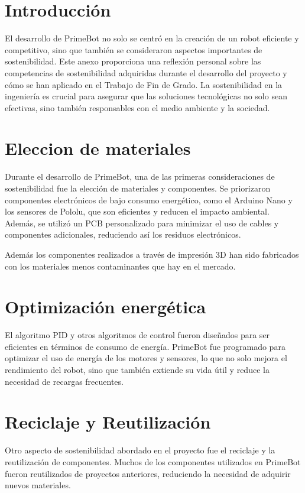 
\section{Introducción}

El desarrollo de PrimeBot no solo se centró en la creación de un robot eficiente y competitivo, sino que también se consideraron aspectos importantes de sostenibilidad. Este anexo proporciona una reflexión personal sobre las competencias de sostenibilidad adquiridas durante el desarrollo del proyecto y cómo se han aplicado en el Trabajo de Fin de Grado. La sostenibilidad en la ingeniería es crucial para asegurar que las soluciones tecnológicas no solo sean efectivas, sino también responsables con el medio ambiente y la sociedad.

\section{Eleccion de materiales}

Durante el desarrollo de PrimeBot, una de las primeras consideraciones de sostenibilidad fue la elección de materiales y componentes. Se priorizaron componentes electrónicos de bajo consumo energético, como el Arduino Nano y los sensores de Pololu, que son eficientes y reducen el impacto ambiental. Además, se utilizó un PCB personalizado para minimizar el uso de cables y componentes adicionales, reduciendo así los residuos electrónicos.

Además los componentes realizados a través de impresión 3D han sido fabricados con los materiales menos contaminantes que hay en el mercado.

\section{Optimización energética}
El algoritmo PID y otros algoritmos de control fueron diseñados para ser eficientes en términos de consumo de energía. PrimeBot fue programado para optimizar el uso de energía de los motores y sensores, lo que no solo mejora el rendimiento del robot, sino que también extiende su vida útil y reduce la necesidad de recargas frecuentes.

\section{Reciclaje y Reutilización}

Otro aspecto de sostenibilidad abordado en el proyecto fue el reciclaje y la reutilización de componentes. Muchos de los componentes utilizados en PrimeBot fueron reutilizados de proyectos anteriores, reduciendo la necesidad de adquirir nuevos materiales. 

